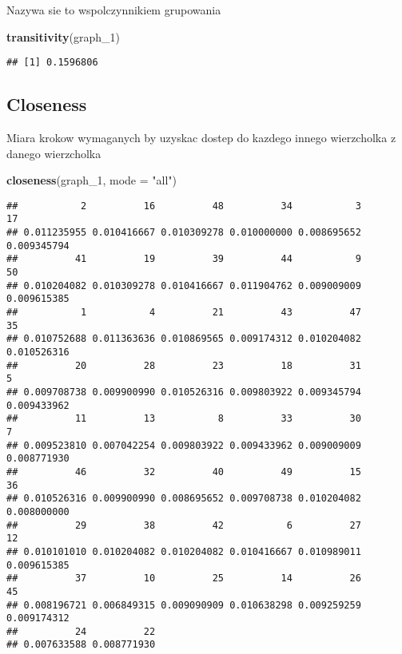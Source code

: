 \documentclass[]{article}
\newenvironment{Shaded}{\begin{snugshade}}{\end{snugshade}}
\newcommand{\KeywordTok}[1]{\textcolor[rgb]{0.13,0.29,0.53}{\textbf{#1}}}
\newcommand{\DataTypeTok}[1]{\textcolor[rgb]{0.13,0.29,0.53}{#1}}
\newcommand{\DecValTok}[1]{\textcolor[rgb]{0.00,0.00,0.81}{#1}}
\newcommand{\StringTok}[1]{\textcolor[rgb]{0.31,0.60,0.02}{#1}}
\newcommand{\NormalTok}[1]{#1}
\begin{document}
Nazywa sie to wspolczynnikiem grupowania

\begin{Shaded}
\begin{Highlighting}[]
\KeywordTok{transitivity}\NormalTok{(graph_}\DecValTok{1}\NormalTok{)}
\end{Highlighting}
\end{Shaded}

\begin{verbatim}
## [1] 0.1596806
\end{verbatim}

\subsection{Closeness}\label{closeness}

Miara krokow wymaganych by uzyskac dostep do kazdego innego wierzcholka
z danego wierzcholka

\begin{Shaded}
\begin{Highlighting}[]
\KeywordTok{closeness}\NormalTok{(graph_}\DecValTok{1}\NormalTok{, }\DataTypeTok{mode =} \StringTok{"all"}\NormalTok{)}
\end{Highlighting}
\end{Shaded}

\begin{verbatim}
##           2          16          48          34           3          17 
## 0.011235955 0.010416667 0.010309278 0.010000000 0.008695652 0.009345794 
##          41          19          39          44           9          50 
## 0.010204082 0.010309278 0.010416667 0.011904762 0.009009009 0.009615385 
##           1           4          21          43          47          35 
## 0.010752688 0.011363636 0.010869565 0.009174312 0.010204082 0.010526316 
##          20          28          23          18          31           5 
## 0.009708738 0.009900990 0.010526316 0.009803922 0.009345794 0.009433962 
##          11          13           8          33          30           7 
## 0.009523810 0.007042254 0.009803922 0.009433962 0.009009009 0.008771930 
##          46          32          40          49          15          36 
## 0.010526316 0.009900990 0.008695652 0.009708738 0.010204082 0.008000000 
##          29          38          42           6          27          12 
## 0.010101010 0.010204082 0.010204082 0.010416667 0.010989011 0.009615385 
##          37          10          25          14          26          45 
## 0.008196721 0.006849315 0.009090909 0.010638298 0.009259259 0.009174312 
##          24          22 
## 0.007633588 0.008771930
\end{verbatim}
\end{document}
